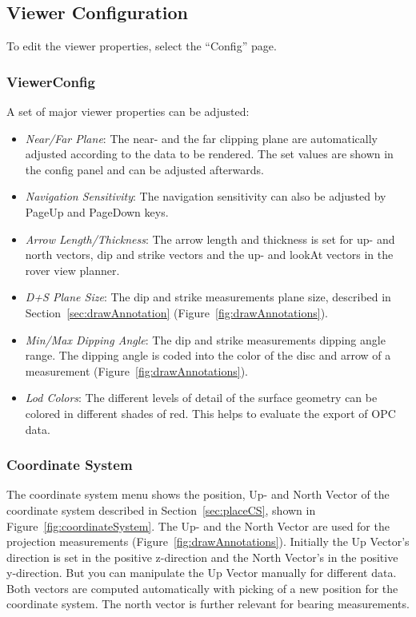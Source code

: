 \subsection{Viewer Configuration}
\label{sec:config}

To edit the viewer properties, select the ``Config'' page.

\subsubsection{ViewerConfig} 

A set of major viewer properties can be adjusted:
\begin{itemize}
	\item \textit{Near/Far Plane}: The near- and the far clipping plane are automatically adjusted according to the data to be rendered. The set values are shown in the config panel and can be adjusted afterwards. 
	\item \textit{Navigation Sensitivity}: The navigation sensitivity can also be adjusted by PageUp and PageDown keys. 
	\item \textit{Arrow Length/Thickness}: The arrow length and thickness is set for up- and north vectors, dip and strike vectors and the up- and lookAt vectors in the rover view planner. 
	\item \textit{D+S Plane Size}: The dip and strike measurements plane size, described in Section~\ref{sec:drawAnnotation}
 (Figure~\ref{fig:drawAnnotations}).
	\item \textit{Min/Max Dipping Angle}: The dip and strike measurements dipping angle range. The dipping angle is coded into the color of the disc and arrow of a measurement (Figure~\ref{fig:drawAnnotations}).
	\item \textit{Lod Colors}: The different levels of detail of the surface geometry can be colored in different shades of red.
			This helps to evaluate the export of OPC data.
\end{itemize}

\subsubsection{Coordinate System} 

The coordinate system menu shows the position, Up- and North Vector of the coordinate system described in Section~\ref{sec:placeCS}, shown in Figure~\ref{fig:coordinateSystem}.
The Up- and the North Vector are used for the projection measurements (Figure~\ref{fig:drawAnnotations}). Initially the Up Vector's direction is set in the positive z-direction and the North Vector's in the positive y-direction. But you can manipulate the Up Vector manually for different data. Both vectors are computed automatically with picking of a new position for the coordinate system. The north vector is further relevant for bearing measurements. %

